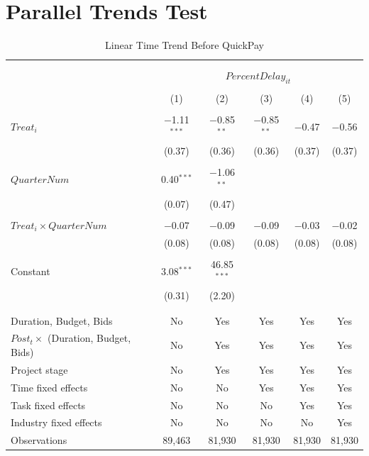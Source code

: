 \documentclass[
]{article}
\begin{document}
\hypertarget{parallel-trends-test}{%
\section{Parallel Trends Test}\label{parallel-trends-test}}

\begin{table}[H] \centering 
  \caption{Linear Time Trend Before QuickPay} 
  \label{} 
\small 
\begin{tabular}{@{\extracolsep{-2pt}}lccccc} 
\\[-1.8ex]\hline 
\hline \\[-1.8ex] 
\\[-1.8ex] & \multicolumn{5}{c}{$PercentDelay_{it}$} \\ 
\\[-1.8ex] & (1) & (2) & (3) & (4) & (5)\\ 
\hline \\[-1.8ex] 
 $Treat_i$ & $-$1.11$^{***}$ & $-$0.85$^{**}$ & $-$0.85$^{**}$ & $-$0.47 & $-$0.56 \\ 
  & (0.37) & (0.36) & (0.36) & (0.37) & (0.37) \\ 
  & & & & & \\ 
 $QuarterNum$ & 0.40$^{***}$ & $-$1.06$^{**}$ &  &  &  \\ 
  & (0.07) & (0.47) &  &  &  \\ 
  & & & & & \\ 
 $Treat_i \times QuarterNum$ & $-$0.07 & $-$0.09 & $-$0.09 & $-$0.03 & $-$0.02 \\ 
  & (0.08) & (0.08) & (0.08) & (0.08) & (0.08) \\ 
  & & & & & \\ 
 Constant & 3.08$^{***}$ & 46.85$^{***}$ &  &  &  \\ 
  & (0.31) & (2.20) &  &  &  \\ 
  & & & & & \\ 
\hline \\[-1.8ex] 
Duration, Budget, Bids & No & Yes & Yes & Yes & Yes \\ 
$Post_t \times$  (Duration, Budget, Bids) & No & Yes & Yes & Yes & Yes \\ 
Project stage & No & Yes & Yes & Yes & Yes \\ 
Time fixed effects & No & No & Yes & Yes & Yes \\ 
Task fixed effects & No & No & No & Yes & Yes \\ 
Industry fixed effects & No & No & No & No & Yes \\ 
Observations & 89,463 & 81,930 & 81,930 & 81,930 & 81,930 \\ 

\end{tabular}
\end{table}
\end{document}
